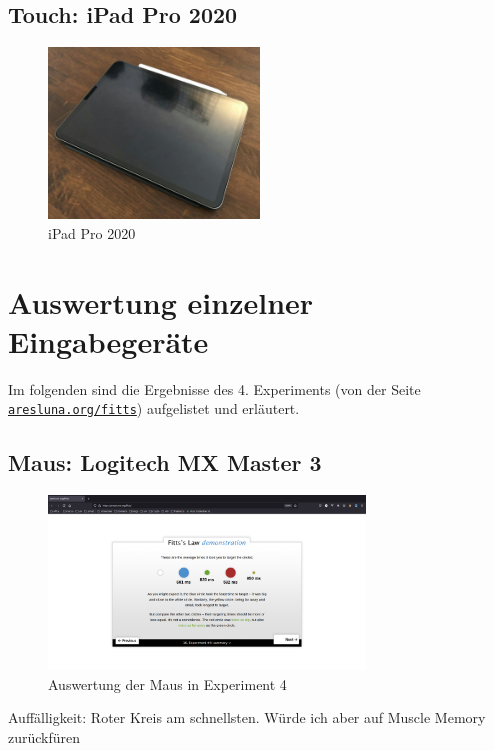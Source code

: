 \documentclass{article}
\begin{document}
\subsection{Touch: iPad Pro 2020}

\begin{figure}[h!]
	\centering
	\includegraphics[width=0.5\textwidth]{ipad}
	\caption{iPad Pro 2020}
\end{figure}

\section{Auswertung einzelner Eingabegeräte}

Im folgenden sind die Ergebnisse des 4. Experiments (von der Seite
\href{https://www.aresluna.org/fitts}{\texttt{aresluna.org/fitts}}) aufgelistet
und erläutert.

\subsection{Maus: Logitech MX Master 3}

\begin{figure}[h!]
	\centering
	\includegraphics[width=0.75\textwidth]{experiment-4-maus}
	\caption{Auswertung der Maus in Experiment 4}
\end{figure}

Auffälligkeit: Roter Kreis am schnellsten. Würde ich aber auf Muscle Memory
zurückfüren
\end{document}
